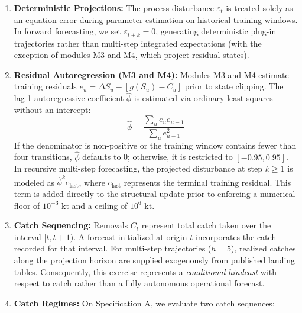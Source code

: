 \documentclass[11pt]{article}
\providecommand{\tightlist}{\setlength{\itemsep}{0.2em}\setlength{\parskip}{0pt}}
\begin{document}
\begin{enumerate}
\def\labelenumi{\arabic{enumi}.}
\tightlist
\item
  \textbf{Deterministic Projections:} The process disturbance
  \(\varepsilon_t\) is treated solely as an equation error during
  parameter estimation on historical training windows. In forward
  forecasting, we set \(\varepsilon_{t+k} = 0\), generating
  deterministic plug-in trajectories rather than multi-step integrated
  expectations (with the exception of modules M3 and M4, which project
  residual states).
\item
  \textbf{Residual Autoregression (M3 and M4):} Modules M3 and M4
  estimate training residuals \(e_u = \Delta S_u - [g(S_u) - C_u]\)
  prior to state clipping. The lag-1 autoregressive coefficient
  \(\hat{\phi}\) is estimated via ordinary least squares without an
  intercept:
  \[\hat{\phi} = \frac{\sum_{u} e_u e_{u-1}}{\sum_{u} e_{u-1}^2}\] If
  the denominator is non-positive or the training window contains fewer
  than four transitions, \(\hat{\phi}\) defaults to 0; otherwise, it is
  restricted to \([-0.95, 0.95]\). In recursive multi-step forecasting,
  the projected disturbance at step \(k \ge 1\) is modeled as
  \(\hat{\phi}^k e_{\mathrm{last}}\), where \(e_{\mathrm{last}}\)
  represents the terminal training residual. This term is added directly
  to the structural update prior to enforcing a numerical floor of
  \(10^{-3}\text{ kt}\) and a ceiling of \(10^6\text{ kt}\).
\item
  \textbf{Catch Sequencing:} Removals \(C_t\) represent total catch
  taken over the interval \([t, t+1)\). A forecast initialized at origin
  \(t\) incorporates the catch recorded for that interval. For
  multi-step trajectories (\(h=5\)), realized catches along the
  projection horizon are supplied exogenously from published landing
  tables. Consequently, this exercise represents a \emph{conditional
  hindcast} with respect to catch rather than a fully autonomous
  operational forecast.
\item
  \textbf{Catch Regimes:} On Specification A, we evaluate two catch
  sequences:


\end{enumerate}
\end{document}
